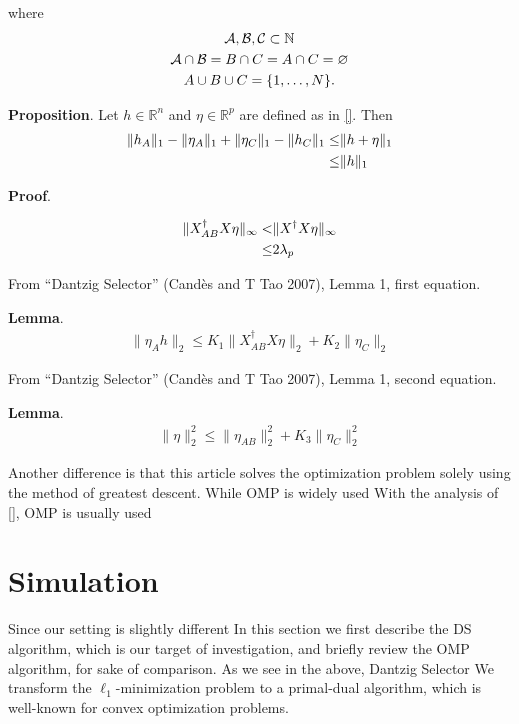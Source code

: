 \documentclass[12pt]{article}
\newcounter{numResult}
\begin{document}
where
\begin{gather}
\mathcal{A}, \mathcal{B}, \mathcal{C} \subset \mathbb{N} \\ \notag
\mathcal{A} \cap \mathcal{B} =B \cap C =A \cap C =\varnothing \\ \notag
A \cup B \cup C =\{1, \dotsc, N\}.
\end{gather}


\textbf{Proposition}.
Let \(h \in \mathbb{R}^n\) and \(\eta \in \mathbb{R}^p\) are defined as in \eqref{}.
Then
\begin{align}
\|h_A\|_1 -\|\eta_A\|_1 +\|\eta_C\|_1 -\|h_C\|_1
\leq& \|h +\eta\|_1 \\ \notag
\leq& \|h\|_1
\end{align}

\textbf{Proof}.


\begin{align}
\|X^\dagger_{AB} X \eta\|_\infty
<&\|X^\dagger X \eta\|_\infty \\ \notag
\leq& 2 \lambda_p
\end{align}

From ``Dantzig Selector'' (Cand\`es and T Tao 2007), Lemma 1, first equation.

\textbf{Lemma}.
\begin{align}
\|\eta_Ah\|_2
\leq K_1 \|X^\dagger_{AB} X \eta\|_2 +K_2 \|\eta_C\|_2
\end{align}


From ``Dantzig Selector'' (Cand\`es and T Tao 2007), Lemma 1, second equation.

\textbf{Lemma}.
\begin{align}
\|\eta\|_2^2
\leq \|\eta_{AB}\|_2^2 +K_3 \|\eta_C\|_2^2
\end{align}

Another difference is that this article solves the optimization problem solely using the method of greatest descent.
While OMP is widely used 
With the analysis of [], OMP is usually used


\section{Simulation}

Since our setting is slightly different
In this section we first describe the DS algorithm, which is our target of investigation, and briefly review the OMP algorithm, for sake of comparison.
As we see in the above, Dantzig Selector 
We transform the \(\ell_1\)-minimization problem to a primal-dual algorithm, which is well-known for convex optimization problems.
\end{document}
